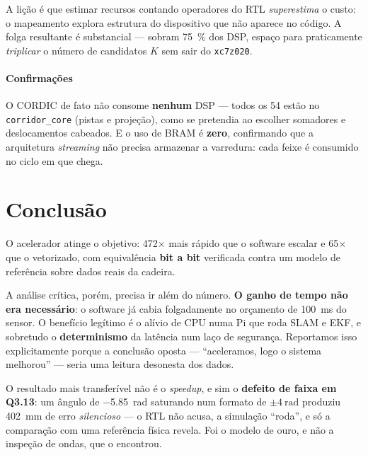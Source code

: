 \documentclass[conference]{IEEEtran}
\begin{document}
A li\c{c}\~ao \'e que estimar recursos contando operadores do RTL \emph{superestima}
o custo: o mapeamento explora estrutura do dispositivo que n\~ao aparece no
c\'odigo. A folga resultante \'e substancial --- sobram \SI{75}{\percent} dos DSP,
espa\c{c}o para praticamente \emph{triplicar} o n\'umero de candidatos $K$ sem
sair do \texttt{xc7z020}.

\paragraph{Confirma\c{c}\~oes} O CORDIC de fato n\~ao consome
\textbf{nenhum} DSP --- todos os \num{54} est\~ao no \texttt{corridor\_core}
(pistas e proje\c{c}\~ao), como se pretendia ao escolher somadores e
deslocamentos cabeados. E o uso de BRAM \'e \textbf{zero}, confirmando que a
arquitetura \emph{streaming} n\~ao precisa armazenar a varredura: cada feixe \'e
consumido no ciclo em que chega.

\section{Conclus\~ao}

O acelerador atinge o objetivo: \num{472}$\times$ mais r\'apido que o software
escalar e \num{65}$\times$ que o vetorizado, com equival\^encia \textbf{bit a
bit} verificada contra um modelo de refer\^encia sobre dados reais da cadeira.

A an\'alise cr\'itica, por\'em, precisa ir al\'em do n\'umero. \textbf{O ganho de
tempo n\~ao era necess\'ario}: o software j\'a cabia folgadamente no or\c{c}amento
de \SI{100}{\milli\second} do sensor. O benef\'icio leg\'itimo \'e o alívio de CPU
numa Pi que roda SLAM e EKF, e sobretudo o \textbf{determinismo} da lat\^encia num
la\c{c}o de seguran\c{c}a. Reportamos isso explicitamente porque a conclus\~ao
oposta --- ``aceleramos, logo o sistema melhorou'' --- seria uma leitura
desonesta dos dados.

O resultado mais transfer\'ivel n\~ao \'e o \emph{speedup}, e sim o
\textbf{defeito de faixa em Q3.13}: um \^angulo de \SI{-5.85}{\radian} saturando
num formato de $\pm\SI{4}{\radian}$ produziu \SI{402}{\milli\metre} de erro
\emph{silencioso} --- o RTL n\~ao acusa, a simula\c{c}\~ao ``roda'', e s\'o a
compara\c{c}\~ao com uma refer\^encia f\'isica revela. Foi o modelo de ouro, e
n\~ao a inspe\c{c}\~ao de ondas, que o encontrou.
\end{document}
